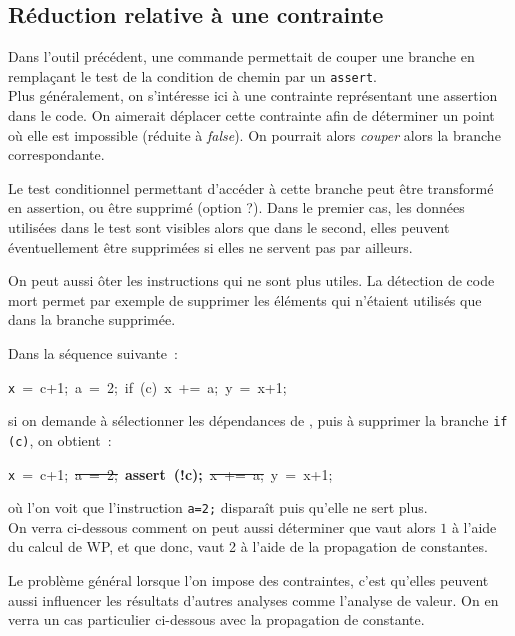 \subsection{Réduction relative à une contrainte}

Dans l'outil précédent, une commande permettait de couper une branche
en remplaçant le test de la condition de chemin par un {\tt assert}.\\

Plus généralement,
on s'intéresse ici à une contrainte représentant une assertion dans le code.
On aimerait déplacer cette contrainte
afin de déterminer un point où elle est impossible (réduite à {\it false}).
On pourrait alors {\it couper} alors la branche correspondante.

Le test conditionnel
permettant d'accéder à cette branche peut être transformé en assertion,
ou être supprimé (option ?).
Dans le premier cas, les données utilisées dans le test
sont visibles alors que dans le second,
elles peuvent éventuellement être supprimées
si elles ne servent pas par ailleurs.

On peut aussi ôter les instructions qui ne sont plus utiles.
La détection de code mort permet par exemple de supprimer les éléments qui
n'étaient utilisés que dans la branche supprimée.

\begin{exemple}
Dans la séquence suivante~:
\begin{center}
\mbox{\texttt x = c+1; a = 2; if (c) x += a; y = x+1;}
\end{center}

si on demande à sélectionner les dépendances de , puis à supprimer la
branche \verb!if (c)!, on obtient~:
\begin{center}
\mbox{\texttt x = c+1; \sout{a = 2;} {\bf assert (!c);} \sout{x += a;} y = x+1;}
\end{center}

où l'on voit que l'instruction \verb!a=2;! disparaît puis qu'elle ne sert plus.\\

On verra ci-dessous comment on peut aussi déterminer que  vaut alors $1$
à l'aide du calcul de WP, et que donc,  vaut 2 à l'aide de la
propagation de constantes.
\end{exemple}

Le problème général lorsque l'on impose des contraintes,
c'est qu'elles peuvent aussi influencer les résultats d'autres analyses
comme l'analyse de valeur. On en verra un cas particulier
ci-dessous avec la propagation de constante.

